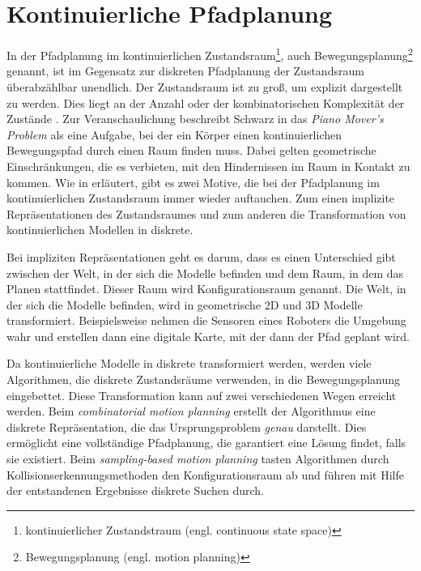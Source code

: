\section{Kontinuierliche Pfadplanung} \label{Kapitel 3.4}
In der Pfadplanung im kontinuierlichen Zustandsraum\footnote{kontinuierlicher Zustandstraum (engl. continuous state space)}, auch Bewegungsplanung\footnote{Bewegungsplanung (engl. motion planning)} genannt, ist im Gegensatz zur diskreten Pfadplanung der Zustandsraum überabzählbar unendlich.  Der Zustandsraum ist zu groß, um explizit dargestellt zu werden. Dies liegt an der Anzahl oder der kombinatorischen Komplexität der Zustände \cite[~S. 17]{Lav06}.
Zur Veranschaulichung beschreibt Schwarz in \cite{Schw:83} das \textit{Piano Mover's Problem} als eine Aufgabe, bei der ein Körper einen kontinuierlichen Bewegungspfad durch einen Raum finden muss. Dabei gelten geometrische Einschränkungen, die es verbieten, mit den Hindernissen im Raum in Kontakt zu kommen.
Wie in \cite[~S. 79 f.]{Lav06} erläutert, gibt es zwei Motive, die bei der Pfadplanung im kontinuierlichen Zustandsraum immer wieder auftauchen. Zum einen implizite Repräsentationen des Zustandsraumes und zum anderen die Transformation von kontinuierlichen Modellen in diskrete.

Bei impliziten Repräsentationen geht es darum, dass es einen Unterschied gibt zwischen der Welt, in der sich die Modelle befinden und dem Raum, in dem das Planen stattfindet. Dieser Raum wird Konfigurationsraum genannt. Die Welt, in der sich die Modelle befinden, wird in geometrische 2D und 3D Modelle transformiert. Beispielsweise nehmen die Sensoren eines Roboters die Umgebung wahr und erstellen dann eine digitale Karte, mit der dann der Pfad geplant wird.

Da kontinuierliche Modelle in diskrete transformiert werden, werden viele Algorithmen, die diskrete Zustandsräume verwenden, in die Bewegungsplanung eingebettet. Diese Transformation kann auf zwei verschiedenen Wegen erreicht werden. Beim \textit{combinatorial motion planning} erstellt der Algorithmus eine diskrete Repräsentation, die das Ursprungsproblem \textit{genau} darstellt. Dies ermöglicht eine vollständige Pfadplanung, die garantiert eine Lösung findet, falls sie existiert. Beim \textit{sampling-based motion planning} tasten Algorithmen durch Kollisionserkennungsmethoden den Konfigurationsraum ab und führen mit Hilfe der entstandenen Ergebnisse diskrete Suchen durch.


